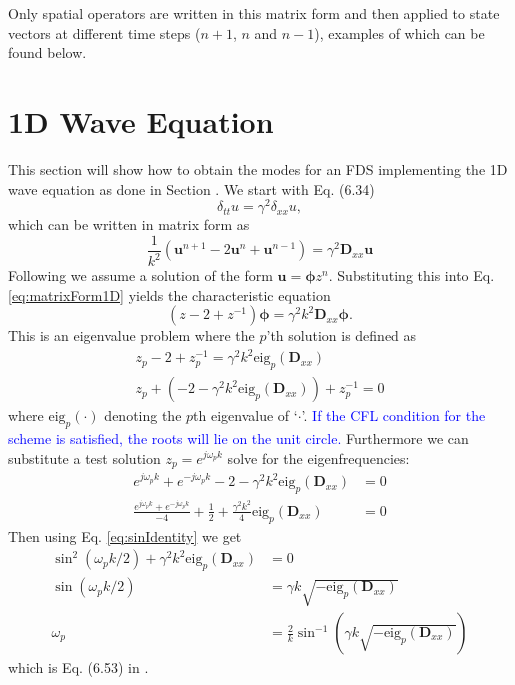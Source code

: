 \documentclass{article}
\def\SWcomment[#1]{\textcolor{blue}{#1}}
\def\u{\mathbf{u}}
\def\Dxx{\mathbf{D}_{xx}}
\begin{document}
Only spatial operators are written in this matrix form and then applied to state vectors at different time steps ($n+1$, $n$ and $n-1$), examples of which can be found below.

\section{1D Wave Equation}
This section will show how to obtain the modes for an FDS implementing the 1D wave equation as done in Section . We start with Eq. (6.34)
\begin{equation}
    \delta_{tt}u = \gamma^2\delta_{xx}u,
\end{equation}
which can be written in matrix form as
\begin{equation}\label{eq:matrixForm1D}
    \frac{1}{k^2}\left(\u^{n+1}-2\u^n+\u^{n-1}\right) = \gamma^2 \Dxx\u
\end{equation}
Following \cite{Bilbao2009} we assume a solution of the form $\u = \boldsymbol{\phi}z^n$. Substituting this into Eq. \eqref{eq:matrixForm1D} yields the characteristic equation
\begin{equation}
    (z - 2 + z^{-1})\boldsymbol{\phi} = \gamma^2k^2\Dxx \boldsymbol{\phi}.
\end{equation}
This is an eigenvalue problem where the $p$'th solution is defined as 
\begin{gather}
    z_p-2+z_p^{-1} = \gamma^2k^2\text{eig}_p(\Dxx)\nonumber\\
    z_p+(-2-\gamma^2k^2\text{eig}_p(\Dxx))+z_p^{-1}=0
\end{gather}
where $\text{eig}_p(\cdot)$ denoting the $p$th eigenvalue of `$\cdot$'. \SWcomment[If the CFL condition for the scheme is satisfied, the roots will lie on the unit circle.] Furthermore we can substitute a test solution $z_p=e^{j\omega_pk}$ solve for the eigenfrequencies:
\begin{align*}
    e^{j\omega_pk}+e^{-j\omega_pk}-2-\gamma^2k^2\text{eig}_p(\Dxx)&=0\\
    \frac{e^{j\omega_pk}+e^{-j\omega_pk}}{-4}+\frac{1}{2}+\frac{\gamma^2k^2}{4}\text{eig}_p(\Dxx)&=0
\end{align*}
Then using Eq. \eqref{eq:sinIdentity} we get
\begin{align}
    \sin^2(\omega_pk/2)+\gamma^2k^2\text{eig}_p(\Dxx)&=0\nonumber\\
    \sin(\omega_pk/2)&=\gamma k\sqrt{-\text{eig}_p(\Dxx)}\nonumber\\
    \omega_p &= \frac{2}{k}\sin^{-1}\left(\gamma k\sqrt{-\text{eig}_p(\Dxx)}\right)
\end{align}
which is Eq. (6.53) in \cite{Bilbao2009}.
\end{document}
